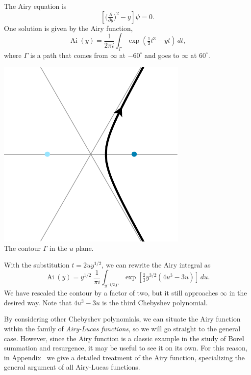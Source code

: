\documentclass{article}
\theoremstyle{definition}
\DeclareMathOperator{\Ai}{Ai}
\begin{document}
The Airy equation is
\begin{equation}\label{eqn:airy}
\left[\big(\tfrac{\partial}{\partial y}\big)^2 - y\right] \psi = 0.
\end{equation}
One solution is given by the Airy function,
\[ \Ai(y) = \frac{1}{2\pi i} \int_{\Gamma} \exp\left(\tfrac{1}{3}t^3 - yt\right)\,dt, \]
where $\Gamma$ is a path that comes from $\infty$ at $-60^\circ$ and goes to $\infty$ at $60^\circ$.
\begin{center}
\includegraphics{figures/u_contour_3.pdf} \\[1em]
{\small The contour $\Gamma$ in the $u$ plane.}
\end{center}
With the substitution $t = 2uy^{1/2}$, we can rewrite the Airy integral as
\[ \Ai(y) = y^{1/2}\;\frac{1}{\pi i} \int_{y^{-1/2} \Gamma} \exp\left[\tfrac{2}{3}y^{3/2} \left(4u^3 - 3u\right)\right]\,du. \]
We have rescaled the contour by a factor of two, but it still approaches $\infty$ in the desired way. Note that $4u^3 - 3u$ is the third Chebyshev polynomial.

By considering other Chebyshev polynomials, we can situate the Airy function within the family of {\em Airy-Lucas functions}, so we will go straight to the general case. However, since the Airy function is a classic example in the study of Borel summation and resurgence, it may be useful to see it on its own. For this reason, in Appendix~\cite{airy-appendix} we give a detailed treatment of the Airy function, specializing the general argument of all Airy-Lucas functions. 
\end{document}
